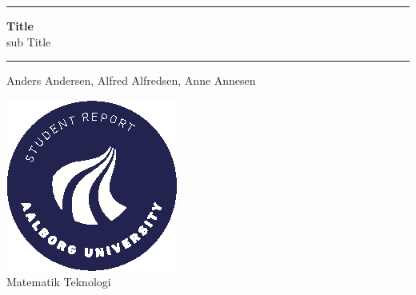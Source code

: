 \begin{titlepage}
    \begin{center}
        \rule{\linewidth}{1pt}
        \Huge{\textbf{Title}} \\
        \Large{sub Title}
        \rule{\linewidth}{1pt}
    \end{center}
    \vspace{0.2cm}
    \begin{center}
        \large Anders Andersen, Alfred Alfredsen, Anne Annesen
        \\
        \vspace{0.2cm}
        
    \end{center}
    \vfill
    \begin{center}
        \includegraphics[width=0.2\paperwidth]{aau_logo_circle_en.eps}\\
        \vspace{0.2cm}
        \large Matematik Teknologi
      \end{center}
\end{titlepage}